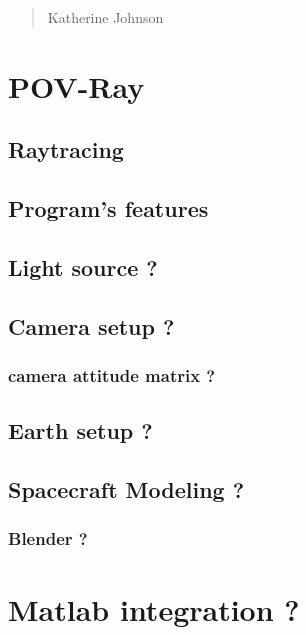 \begin{quotation}
{\footnotesize
{}
\begin{flushright}
Katherine Johnson
\end{flushright}
}
\end{quotation}
\vspace{0.5cm}

\section{POV-Ray}

\subsection{Raytracing}

\subsection{Program's features}

\subsection{Light source ?}

\subsection{Camera setup ?}

\subsubsection{camera attitude matrix ?}

\subsection{Earth setup ?}

\subsection{Spacecraft Modeling ?}
\subsubsection{Blender ?}

\section{Matlab integration ?}

